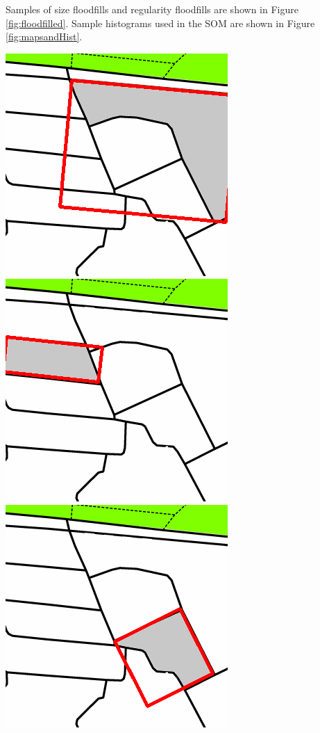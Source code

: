 \documentclass{nature}
\makeatletter
\renewenvironment*{figure}{\@float{figure}}{\end@float}
\makeatother
\begin{document}
\begin{methods}
Samples of size floodfills and regularity floodfills are shown in Figure \ref{fig:floodfilled}. Sample histograms used in the SOM are shown in Figure \ref{fig:mapsandHist}.

\begin{figure}
\centering    
\includegraphics[scale=0.3]{Images/Floodfill/image_3.png}  
\includegraphics[scale=0.3]{Images/Floodfill/image_4.png}  
\includegraphics[scale=0.3]{Images/Floodfill/image_7.png}  

\end{figure}
\end{methods}
\end{document}
